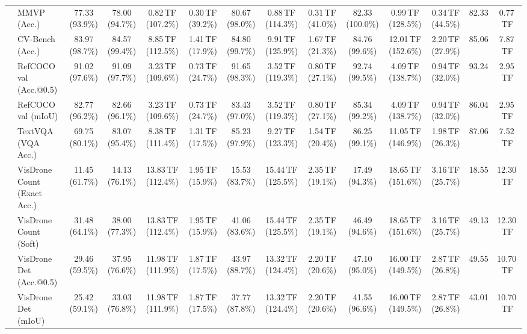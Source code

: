 \begin{table}[t]
\begin{center}
\begin{small}
\begin{sc}
{\begin{tabular}{llcccccccccccc}
& MMVP (Acc.) & 77.33 (93.9\%) & 78.00 (94.7\%) & 0.82\,TF (107.2\%) & 0.30\,TF (39.2\%) & 80.67 (98.0\%) & 0.88\,TF (114.3\%) & 0.31\,TF (41.0\%) & \cellcolor{gray!15}82.33 (100.0\%) & 0.99\,TF (128.5\%) & 0.34\,TF (44.5\%) & 82.33 & 0.77\,TF \\
& CV-Bench (Acc.) & 83.97 (98.7\%) & \cellcolor{gray!15}84.57 (99.4\%) & 8.85\,TF (112.5\%) & 1.41\,TF (17.9\%) & \cellcolor{gray!15}84.80 (99.7\%) & 9.91\,TF (125.9\%) & 1.67\,TF (21.3\%) & \cellcolor{gray!15}84.76 (99.6\%) & 12.01\,TF (152.6\%) & 2.20\,TF (27.9\%) & 85.06 & 7.87\,TF \\
& RefCOCO val (Acc.@0.5) & 91.02 (97.6\%) & 91.09 (97.7\%) & 3.23\,TF (109.6\%) & 0.73\,TF (24.7\%) & \cellcolor{gray!15}91.65 (98.3\%) & 3.52\,TF (119.3\%) & 0.80\,TF (27.1\%) & \cellcolor{gray!15}92.74 (99.5\%) & 4.09\,TF (138.7\%) & 0.94\,TF (32.0\%) & 93.24 & 2.95\,TF \\
& RefCOCO val (mIoU) & 82.77 (96.2\%) & 82.66 (96.1\%) & 3.23\,TF (109.6\%) & 0.73\,TF (24.7\%) & 83.43 (97.0\%) & 3.52\,TF (119.3\%) & 0.80\,TF (27.1\%) & \cellcolor{gray!15}85.34 (99.2\%) & 4.09\,TF (138.7\%) & 0.94\,TF (32.0\%) & 86.04 & 2.95\,TF \\
& TextVQA (VQA Acc.) & 69.75 (80.1\%) & 83.07 (95.4\%) & 8.38\,TF (111.4\%) & 1.31\,TF (17.5\%) & 85.23 (97.9\%) & 9.27\,TF (123.3\%) & 1.54\,TF (20.4\%) & \cellcolor{gray!15}86.25 (99.1\%) & 11.05\,TF (146.9\%) & 1.98\,TF (26.3\%) & 87.06 & 7.52\,TF \\
& VisDrone Count (Exact Acc.) & 11.45 (61.7\%) & 14.13 (76.1\%) & 13.83\,TF (112.4\%) & 1.95\,TF (15.9\%) & 15.53 (83.7\%) & 15.44\,TF (125.5\%) & 2.35\,TF (19.1\%) & 17.49 (94.3\%) & 18.65\,TF (151.6\%) & 3.16\,TF (25.7\%) & 18.55 & 12.30\,TF \\
& VisDrone Count (Soft) & 31.48 (64.1\%) & 38.00 (77.3\%) & 13.83\,TF (112.4\%) & 1.95\,TF (15.9\%) & 41.06 (83.6\%) & 15.44\,TF (125.5\%) & 2.35\,TF (19.1\%) & 46.49 (94.6\%) & 18.65\,TF (151.6\%) & 3.16\,TF (25.7\%) & 49.13 & 12.30\,TF \\
& VisDrone Det (Acc.@0.5) & 29.46 (59.5\%) & 37.95 (76.6\%) & 11.98\,TF (111.9\%) & 1.87\,TF (17.5\%) & 43.97 (88.7\%) & 13.32\,TF (124.4\%) & 2.20\,TF (20.6\%) & 47.10 (95.0\%) & 16.00\,TF (149.5\%) & 2.87\,TF (26.8\%) & 49.55 & 10.70\,TF \\
& VisDrone Det (mIoU) & 25.42 (59.1\%) & 33.03 (76.8\%) & 11.98\,TF (111.9\%) & 1.87\,TF (17.5\%) & 37.77 (87.8\%) & 13.32\,TF (124.4\%) & 2.20\,TF (20.6\%) & 41.55 (96.6\%) & 16.00\,TF (149.5\%) & 2.87\,TF (26.8\%) & 43.01 & 10.70\,TF \\

\end{tabular}}
\end{sc}
\end{small}
\end{center}
\end{table}
